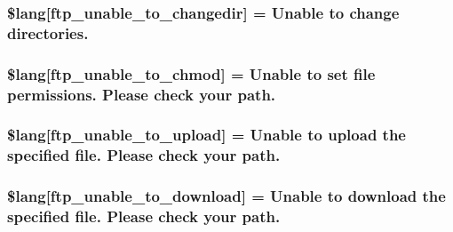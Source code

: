 \subsubsection[{\$lang}]{\setlength{\rightskip}{0pt plus 5cm}\$lang\mbox{[}\textquotesingle{}ftp\+\_\+unable\+\_\+to\+\_\+changedir\textquotesingle{}\mbox{]} = \textquotesingle{}Unable to change directories.\textquotesingle{}}\label{_admin_2system_2language_2english_2ftp__lang_8php_a2e8eab1a2d2d33cde249097df270b7df}
\hypertarget{_admin_2system_2language_2english_2ftp__lang_8php_a9ffd10144a0dfd5a3c7ab69e4edf1fdf}{}
\subsubsection[{\$lang}]{\setlength{\rightskip}{0pt plus 5cm}\$lang\mbox{[}\textquotesingle{}ftp\+\_\+unable\+\_\+to\+\_\+chmod\textquotesingle{}\mbox{]} = \textquotesingle{}Unable to set file permissions. Please check your path.\textquotesingle{}}\label{_admin_2system_2language_2english_2ftp__lang_8php_a9ffd10144a0dfd5a3c7ab69e4edf1fdf}
\hypertarget{_admin_2system_2language_2english_2ftp__lang_8php_a1fd0c9f4e0f3be691a809ce804900ed7}{}
\subsubsection[{\$lang}]{\setlength{\rightskip}{0pt plus 5cm}\$lang\mbox{[}\textquotesingle{}ftp\+\_\+unable\+\_\+to\+\_\+upload\textquotesingle{}\mbox{]} = \textquotesingle{}Unable to upload the specified file. Please check your path.\textquotesingle{}}\label{_admin_2system_2language_2english_2ftp__lang_8php_a1fd0c9f4e0f3be691a809ce804900ed7}
\hypertarget{_admin_2system_2language_2english_2ftp__lang_8php_a65fa9f8b6a3da91390b36721c2a9775b}{}
\subsubsection[{\$lang}]{\setlength{\rightskip}{0pt plus 5cm}\$lang\mbox{[}\textquotesingle{}ftp\+\_\+unable\+\_\+to\+\_\+download\textquotesingle{}\mbox{]} = \textquotesingle{}Unable to download the specified file. Please check your path.\textquotesingle{}}\label{_admin_2system_2language_2english_2ftp__lang_8php_a65fa9f8b6a3da91390b36721c2a9775b}
\hypertarget{_admin_2system_2language_2english_2ftp__lang_8php_abf3e74ee1af13c9b0f0cc63fbb9081f1}{}
